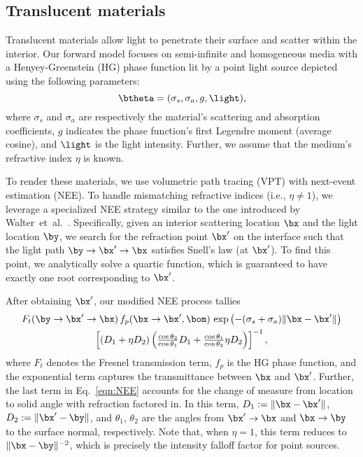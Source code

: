 \subsection{Translucent materials}
\label{ssec:scattering}
%
Translucent materials allow light to penetrate their surface and scatter within the interior.
Our forward model focuses on semi-infinite and homogeneous media with a Henyey-Greenstein (HG) phase function lit by a point light source depicted using the following parameters:
%
\[
\btheta = (\sigma_s, \sigma_a, g, \light),
\]
%
where $\sigma_s$ and $\sigma_a$ are respectively the material's scattering and absorption coefficients, $g$ indicates the phase function's first Legendre moment (average cosine), and $\light$ is the light intensity.
Further, we assume that the medium's refractive index $\eta$ is known.

To render these materials, we use volumetric path tracing (VPT) with next-event estimation (NEE).
To handle mismatching refractive indices (i.e., $\eta \neq 1$), we leverage a specialized NEE strategy similar to the one introduced by Walter~et~al.~\cite{Walter:2009:SSR}.
Specifically, given an interior scattering location $\bx$ and the light location $\by$, we search for the refraction point $\bx'$ on the interface such that the light path $\by \to \bx' \to \bx$ satisfies Snell's law (at $\bx'$).
To find this point, we analytically solve a quartic function, which is guaranteed to have exactly one root corresponding to $\bx'$.

After obtaining $\bx'$, our modified NEE process tallies
%
\begin{multline}
	\label{eqn:NEE}
	F_t(\by \to \bx' \to \bx) \, f_p(\bx \to \bx', \bom) \, \exp\left(-(\sigma_s + \sigma_a) \| \bx - \bx' \|\right)\\
	\left[ (D_1 + \eta D_2) \left( \tfrac{\cos\theta_2}{\cos\theta_1}D_1 + \tfrac{\cos\theta_1}{\cos\theta_2} \eta D_2 \right) \right]^{-1},
\end{multline}
%
where $F_t$ denotes the Fresnel transmission term, $f_p$ is the HG phase function, and the exponential term captures the transmittance between $\bx$ and $\bx'$.
Further, the last term in Eq.~\eqref{eqn:NEE} accounts for the change of measure from location to solid angle with refraction factored in.
In this term, $D_1 := \| \bx - \bx' \|$, $D_2 := \| \bx' - \by \|$, and $\theta_1$, $\theta_2$ are the angles from $\bx' \to \bx$ and $\bx \to \by$ to the surface normal, respectively. %
Note that, when $\eta = 1$, this term reduces to $\| \bx - \by \|^{-2}$, which is precisely the intensity falloff factor for point sources.

